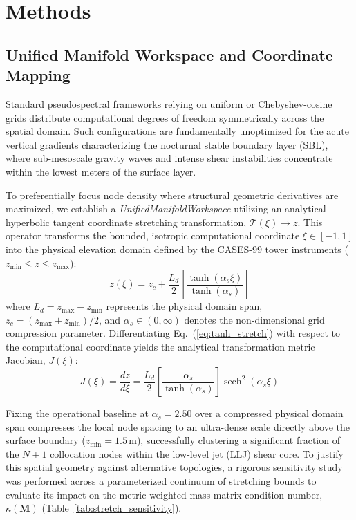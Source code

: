 \section{Methods}
\label{sec:methods}

\subsection{Unified Manifold Workspace and Coordinate Mapping}
\label{sec:methods:manifold}


Standard pseudospectral frameworks relying on uniform or Chebyshev-cosine grids distribute computational degrees of freedom symmetrically across the spatial domain. Such configurations are fundamentally unoptimized for the acute vertical gradients characterizing the nocturnal stable boundary layer (SBL), where sub-mesoscale gravity waves and intense shear instabilities concentrate within the lowest meters of the surface layer.

To preferentially focus node density where structural geometric derivatives are maximized, we establish a \emph{UnifiedManifoldWorkspace} utilizing an analytical hyperbolic tangent coordinate stretching transformation, $\mathcal{T}(\xi) \rightarrow z$. This operator transforms the bounded, isotropic computational coordinate $\xi \in [-1, 1]$ into the physical elevation domain defined by the CASES-99 tower instruments ($z_{\min} \le z \le z_{\max}$):
\begin{equation}
z(\xi) = z_c + \frac{L_d}{2} \left[ \frac{\tanh(\alpha_s \xi)}{\tanh(\alpha_s)} \right]
\label{eq:tanh_stretch}
\end{equation}
where $L_d = z_{\max} - z_{\min}$ represents the physical domain span, $z_c = (z_{\max} + z_{\min})/2$, and $\alpha_s \in (0, \infty)$ denotes the non-dimensional grid compression parameter. Differentiating Eq.~(\ref{eq:tanh_stretch}) with respect to the computational coordinate yields the analytical transformation metric Jacobian, $J(\xi)$:
\begin{equation}
J(\xi) = \frac{dz}{d\xi} = \frac{L_d}{2} \left[ \frac{\alpha_s}{\tanh(\alpha_s)} \right] \operatorname{sech}^2(\alpha_s \xi)
\label{eq:jacobian_stretched}
\end{equation}

Fixing the operational baseline at $\alpha_s = 2.50$ over a compressed physical domain span compresses the local node spacing to an ultra-dense scale directly above the surface boundary ($z_{\min} = 1.5\,\text{m}$), successfully clustering a significant fraction of the $N+1$ collocation nodes within the low-level jet (LLJ) shear core. To justify this spatial geometry against alternative topologies, a rigorous sensitivity study was performed across a parameterized continuum of stretching bounds to evaluate its impact on the metric-weighted mass matrix condition number, $\kappa(\mathbf{M})$ (Table~\ref{tab:stretch_sensitivity}).

